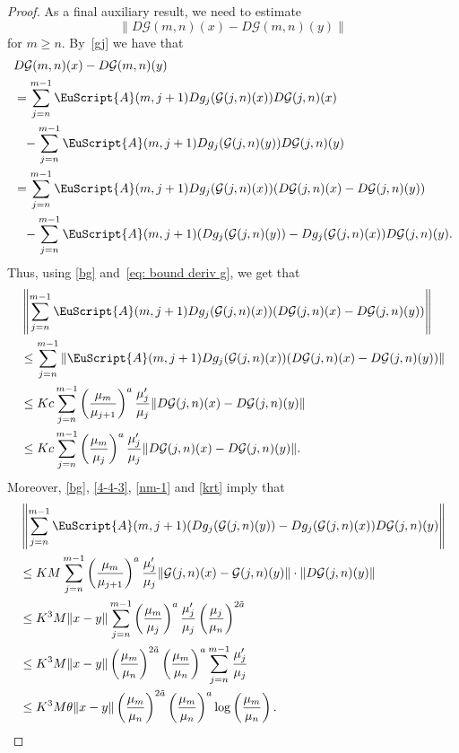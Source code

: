 \documentclass[reqno, a4paper, 10pt]{amsart}
\theoremstyle{plain}
\numberwithin{equation}{section}
\theoremstyle{remark}
\def\cA{\EuScript{A}}
\begin{document}
\begin{proof}
As a final auxiliary result, we need to estimate
\[
\|D\mathcal G(m, n)(x)-D\mathcal G(m, n)(y)\|
\]
for $m\ge n$. By~\eqref{gj} we have that
\[
\begin{split}
&D\mathcal G(m, n)(x)-D\mathcal G(m, n)(y)\\
&=\sum_{j=n}^{m-1}\cA(m, j+1)Dg_j(\mathcal G(j, n)(x))D\mathcal G(j, n)(x) \\
&\phantom{=}-\sum_{j=n}^{m-1}\cA(m, j+1)Dg_j(\mathcal G(j, n)(y))D\mathcal G(j, n)(y) \\
&=\sum_{j=n}^{m-1}\cA(m, j+1)Dg_j(\mathcal G(j, n)(x))(D\mathcal G(j, n)(x)-D\mathcal G(j, n)(y))\\
&\phantom{=}-\sum_{j=n}^{m-1}\cA(m, j+1)(D g_j(\mathcal G(j, n)(y))-D g_j(\mathcal G(j, n)(x))D\mathcal G(j, n)(y).
\end{split}
\]
Thus, using \eqref{bg} and~\eqref{eq: bound deriv g}, we get that 
\[
\begin{split}
&\left \|\sum_{j=n}^{m-1}\cA(m, j+1)Dg_j(\mathcal G(j, n)(x))(D\mathcal G(j, n)(x)-D\mathcal G(j, n)(y))\right \| \\
&\le \sum_{j=n}^{m-1}\left \|\cA(m, j+1)Dg_j(\mathcal G(j, n)(x))(D\mathcal G(j, n)(x)-D\mathcal G(j, n)(y)) \right \| \\
&\le Kc \sum_{j=n}^{m-1}\left (\frac{\mu_m}{\mu_{j+1}}\right )^a  \frac{\mu_j'}{\mu_j}\|D\mathcal G(j, n)(x)-D\mathcal G(j, n)(y)\| \\
&\le Kc \sum_{j=n}^{m-1}\left (\frac{\mu_m}{\mu_{j}}\right )^a  \frac{\mu_j'}{\mu_j}\|D\mathcal G(j, n)(x)-D\mathcal G(j, n)(y)\|.
\end{split}
\]
Moreover, \eqref{bg}, \eqref{4-4-3}, \eqref{nm-1} and \eqref{krt} imply that 
\[
\begin{split}
&\left \|\sum_{j=n}^{m-1}\cA(m, j+1)(D g_j(\mathcal G(j, n)(y))-D g_j(\mathcal G(j, n)(x))D\mathcal G(j, n)(y)\right \| \\
&\le KM\sum_{j=n}^{m-1}\left (\frac{\mu_m}{\mu_{j+1}}\right )^a \frac{\mu_j'}{\mu_j}\|\mathcal G(j, n)(x)-\mathcal G(j, n)(y)\| \cdot \|D\mathcal G(j, n)(y)\| \\
&\le K^3M \|x-y\|\sum_{j=n}^{m-1}\left (\frac{\mu_m}{\mu_j}\right )^a \frac{\mu_j'}{\mu_j} \left (\frac{\mu_j}{\mu_n}\right )^{2\tilde a} \\
&\le K^3M\|x-y\|\left (\frac{\mu_m}{\mu_n}\right )^{2\tilde a}\left (\frac{\mu_m}{\mu_n}\right )^a\sum_{j=n}^{m-1}\frac{\mu_j'}{\mu_j} \\
&\le K^3M \theta \|x-y\|\left (\frac{\mu_m}{\mu_n}\right )^{2\tilde a} \left (\frac{\mu_m}{\mu_n}\right )^a \log \left (\frac{\mu_m}{\mu_n}\right ).

\end{split}\]
\end{proof}
\end{document}
